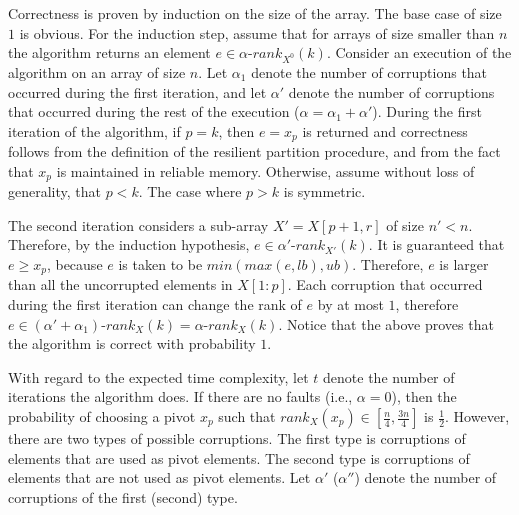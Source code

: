 \documentclass{llncs}
\begin{document}
\begin{pf}
Correctness is proven by induction on the size of the array. The base case of size $1$ is obvious. For the induction step, assume that for arrays of size smaller than $n$ the algorithm returns an element $e \in \alpha\text{-}rank_{X^0}(k)$. Consider an execution of the algorithm on an array of size $n$. Let $\alpha_1$ denote the number of corruptions that occurred during the first iteration, and let $\alpha'$ denote the number of corruptions that occurred during the rest of the execution ($\alpha = \alpha_1 + \alpha'$). During the first iteration of the algorithm, if $p = k$, then $e = x_p$ is returned and correctness follows from the definition of the resilient partition procedure, and from the fact that $x_p$ is maintained in reliable memory. Otherwise, assume without loss of generality, that $p < k$. The case where $p > k$ is symmetric.

The second iteration considers a sub-array $X' = X[p + 1, r]$ of size $n' < n$. Therefore, by the induction hypothesis, $e \in \alpha'\text{-}rank_{X'}(k)$. It is guaranteed that $e \geq x_p$, because $e$ is taken to be $min(max(e,lb),ub)$. Therefore, $e$ is larger than all the uncorrupted elements in $X[1:p]$. Each corruption that occurred during the first iteration can change the rank of $e$ by at most $1$, therefore \linebreak $e \in (\alpha' + \alpha_1)\text{-}rank_X(k) = \alpha\text{-}rank_X(k)$. Notice that the above proves that the algorithm is correct with probability $1$.

With regard to the expected time complexity, let $t$ denote the number of iterations the algorithm does. If there are no faults (i.e., $\alpha = 0$), then the probability of choosing a pivot $x_p$ such that $rank_X(x_p) \in [\frac{n}{4}, \frac{3n}{4}]$ is $\frac{1}{2}$. However, there are two types of possible corruptions. The first type is corruptions of elements that are used as pivot elements. The second type is corruptions of elements that are not used as pivot elements. Let $\alpha'$ ($\alpha''$) denote the number of corruptions of the first (second) type.


\end{pf}
\end{document}
